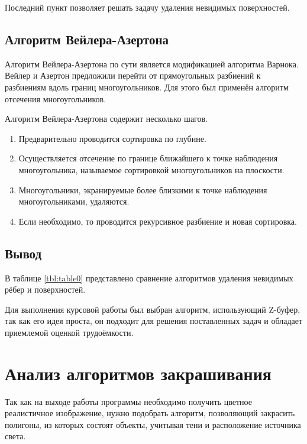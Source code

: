 \begin{enumerate}
Последний пункт позволяет решать задачу удаления невидимых поверхностей.

\subsection{Алгоритм Вейлера-Азертона}

Алгоритм Вейлера-Азертона по сути является модификацией алгоритма Варнока. Вейлер и Азертон предложили перейти от прямоугольных разбиений к разбиениям вдоль границ многоугольников. Для этого был применён алгоритм отсечения многоугольников.

Алгоритм Вейлера-Азертона содержит несколько шагов.
\begin{enumerate}
	\item Предварительно проводится сортировка по глубине.
	\item Осуществляется отсечение по границе ближайшего к точке наблюдения многоугольника, называемое сортировкой многоугольников на плоскости.
	\item Многоугольники, экранируемые более близкими к точке наблюдения многоугольниками, удаляются.
	\item Если необходимо, то проводится рекурсивное разбиение и новая сортировка.
\end{enumerate} 

\subsection*{Вывод}

В таблице \ref{tbl:table0} представлено сравнение алгоритмов удаления невидимых рёбер и поверхностей.

\pagebreak

Для выполнения курсовой работы был выбран алгоритм, использующий Z-буфер, так как его идея проста, он подходит для решения поставленных задач и обладает приемлемой оценкой трудоёмкости.

\section{Анализ алгоритмов закрашивания}

Так как на выходе работы программы необходимо получить цветное реалистичное изображение, нужно подобрать алгоритм, позволяющий закрасить полигоны, из которых состоят объекты, учитывая тени и расположение источника света.


\end{enumerate}
